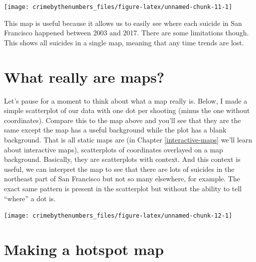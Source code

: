 \documentclass[
]{krantz}
\makeatletter
\newenvironment{Shaded}{\begin{snugshade}}{\end{snugshade}}
\newcommand{\AttributeTok}[1]{\textcolor[rgb]{0.61,0.61,0.61}{#1}}
\newcommand{\FunctionTok}[1]{\textcolor[rgb]{0,0,0}{#1}}
\newcommand{\NormalTok}[1]{#1}
\newcommand{\SpecialCharTok}[1]{\textcolor[rgb]{0,0,0}{#1}}
\newcommand{\StringTok}[1]{\textcolor[rgb]{0.5,0.5,0.5}{#1}}
\newenvironment{kframe}{%
\medskip{}
\setlength{\fboxsep}{.8em}
 \def\at@end@of@kframe{}%
 \ifinner\ifhmode%
  \def\at@end@of@kframe{\end{minipage}}%
  \begin{minipage}{\columnwidth}%
 \fi\fi%
 \def\FrameCommand##1{\hskip\@totalleftmargin \hskip-\fboxsep
 \colorbox{shadecolor}{##1}\hskip-\fboxsep
     \hskip-\linewidth \hskip-\@totalleftmargin \hskip\columnwidth}%
 \MakeFramed {\advance\hsize-\width
   \@totalleftmargin\z@ \linewidth\hsize
   \@setminipage}}%
 {\par\unskip\endMakeFramed%
 \at@end@of@kframe}
\renewenvironment{Shaded}{\begin{kframe}}{\end{kframe}}
\makeatother
\begin{document}
\begin{center}\texttt{[image: crimebythenumbers\_files/figure-latex/unnamed-chunk-11-1]} \end{center}

This map is useful because it allows us to easily see where each suicide in San Francisco happened between 2003 and 2017. There are some limitations though. This shows all suicides in a single map, meaning that any time trends are lost.

\hypertarget{what-really-are-maps}{%
\section{What really are maps?}\label{what-really-are-maps}}

Let's pause for a moment to think about what a map really is. Below, I made a simple scatterplot of our data with one dot per shooting (minus the one without coordinates). Compare this to the map above and you'll see that they are the same except the map has a useful background while the plot has a blank background. That is all static maps are (in Chapter \ref{interactive-maps} we'll learn about interactive maps), scatterplots of coordinates overlayed on a map background. Basically, they are scatterplots with context. And this context is useful, we can interpret the map to see that there are lots of suicides in the northeast part of San Francisco but not so many elsewhere, for example. The exact same pattern is present in the scatterplot but without the ability to tell ``where'' a dot is.

\begin{Shaded}
\end{Shaded}

\begin{center}\texttt{[image: crimebythenumbers\_files/figure-latex/unnamed-chunk-12-1]} \end{center}

\hypertarget{making-a-hotspot-map}{%
\section{Making a hotspot map}\label{making-a-hotspot-map}}
\end{document}
